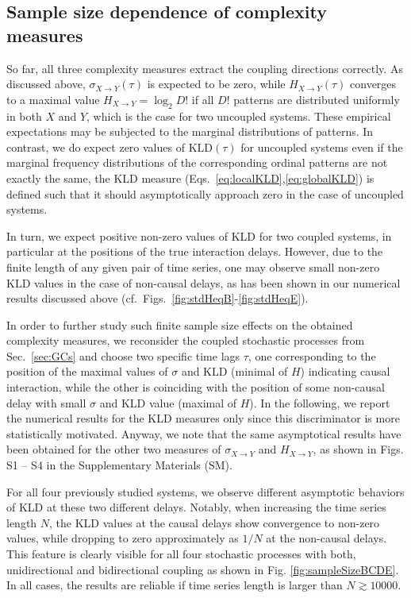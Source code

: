 \documentclass[12pt,aip,cha,reprint,nofootinbib]{revtex4-1}
\begin{document}
\subsection{Sample size dependence of complexity measures}
{\color{red}So far, all three complexity measures extract the coupling directions correctly. As discussed above, $\sigma_{X\to Y}(\tau)$ is expected to be zero, while $H_{X\to Y}(\tau)$ converges to a maximal value $H_{X \to Y} = \log_2 D!$ if all $D!$ patterns are distributed uniformly in both $X$ and $Y$, which is the case for two uncoupled systems. These empirical expectations may be subjected to the marginal distributions of patterns. In contrast, we do expect zero values of $\text{KLD}(\tau)$ for uncoupled systems even }if the marginal frequency distributions of the corresponding ordinal patterns are not exactly the same, the KLD measure (Eqs.~\ref{eq:localKLD},\ref{eq:globalKLD}) is defined such that it should asymptotically approach zero in the case of uncoupled systems. 

In turn, we expect positive non-zero values of KLD for two coupled systems, in particular at the positions of the true interaction delays. However, due to the finite length of any given pair of time series, one may observe small non-zero KLD values in the case of non-causal delays, as has been shown in our numerical results discussed above (cf.\ Figs.~\ref{fig:stdHeqB}-\ref{fig:stdHeqE}). 

{\color{red}In order to further study such finite sample size effects on the obtained complexity measures, we reconsider the coupled stochastic processes from Sec.~\ref{sec:GCs} and choose two specific time lags $\tau$, one corresponding to the position of the maximal values of $\sigma$ and KLD (minimal of $H$) indicating causal interaction, while the other is coinciding with the position of some non-causal delay with small $\sigma$ and KLD value (maximal of $H$). In the following, we report the numerical results for the KLD measures only since this discriminator is more statistically motivated. Anyway, we note that the same asymptotical results have been obtained for the other two measures of $\sigma_{X\to Y}$ and $H_{X\to Y}$, as shown in Figs. S1 -- S4 in the Supplementary Materials (SM). }

For all four previously studied systems, we observe different asymptotic behaviors of KLD at these two different delays. Notably, when increasing the time series length $N$, the KLD values at the causal delays show convergence to non-zero values, while dropping to zero approximately as $1/N$ at the non-causal delays. This feature is clearly visible for all four stochastic processes with both, unidirectional and bidirectional coupling as shown in Fig. \ref{fig:sampleSizeBCDE}. {\color{red}In all cases, the results are reliable if time series length is larger than $N \gtrsim 10000$. }  
\end{document}
